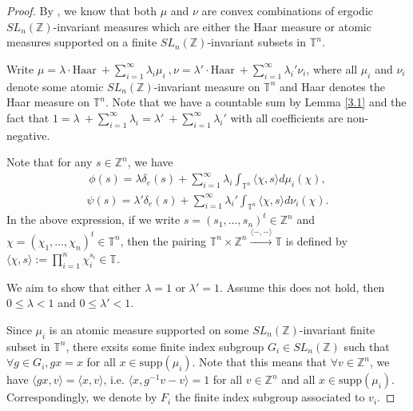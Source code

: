 \documentclass[12pt]{amsart}
\theoremstyle{definition}
\theoremstyle{remark}
\begin{document}
\begin{proof}
By \cite[Proposition 9]{burger}, we know that both $\mu$ and $\nu$ are convex combinations of ergodic $SL_{n}(\mathbb{Z})$-invariant measures which are either the Haar measure or atomic measures supported on a finite $SL_{n}(\mathbb{Z})$-invariant subsets in $\mathbb{T}^n$.

Write $\mu=\lambda \cdot\text{Haar}\ +\sum\limits_{i=1}^{\infty}\lambda_{i}\mu _{i}\ ,\nu=\lambda' \cdot\text{Haar}\ +\sum \limits_{i=1}^{\infty}\lambda_{i}'\nu _{i}$, where all $\mu_{i}$ and $\nu_{i}$ denote some atomic $SL_{n}(\mathbb{Z})$-invariant measure on $\mathbb{T}^n$ and Haar denotes the Haar measure on $\mathbb{T}^n$. Note that we have a countable sum by Lemma \ref{3.1} and the fact that $1=\lambda \ +\sum\limits _{i=1}^{\infty}\lambda_{i}=\lambda' \ +\sum\limits _{i=1}^{\infty}\lambda_{i}'$ with all coefficients are non-negative.

Note that for any  $s\in \mathbb{Z}^n$, we have 
\begin{align*}
    \phi(s)=\lambda\delta_e(s)+\sum\limits_{i=1}^{\infty}\lambda_{i}\int_{\mathbb{T}^{n}}\langle\chi,s\rangle d\mu_{i}(\chi),
\end{align*}
\begin{align*}
\psi(s)=\lambda'\delta_e(s)+\sum\limits_{i=1}^{\infty}\lambda_{i}'\int_{\mathbb{T}^{n}}\langle\chi,s\rangle d\nu_{i}(\chi).
\end{align*}
In the above expression, if we write $s = (s_1,\dots,s_n)^t \in \mathbb{Z}^n$ and $\chi = (\chi_{1},\dots,\chi_n)^t \in \mathbb{T}^n$, then the pairing $\mathbb{T}^n\times \mathbb{Z}^n\overset{\langle -,-\rangle}{\longrightarrow}\mathbb{T}$ is defined by $\langle \chi,s\rangle:=\prod\limits_{i=1}^{n}\chi_{i}^{s_{i}}\in \mathbb{T}$.

We aim to show that either $\lambda=1$ or $\lambda'=1$. Assume this does not hold, then $0\le \lambda < 1 $ and $0\le \lambda'<1$.

Since $\mu_{i}$ is an atomic measure supported on some $SL_{n}(\mathbb{Z})$-invariant finite subset in $\mathbb{T}^n$, there exsits some finite index subgroup $G_{i}\in SL_{n}(\mathbb{Z})$ such that $\forall g\in G_{i}, gx =x$ for all $x \in \text{supp}(\mu_{i})$. Note that this means that $\forall v \in \mathbb{Z}^n$, we have $\langle gx,v \rangle = \langle x, v\rangle$, i.e. $\langle x,g^{-1}v -v \rangle = 1$ for all $v\in \mathbb{Z}^n$ and all $x\in \text{supp}(\mu_{i})$. Correspondingly, we denote by $F_{i}$ the finite index subgroup associated to $v_{i}$.


\end{proof}
\end{document}
